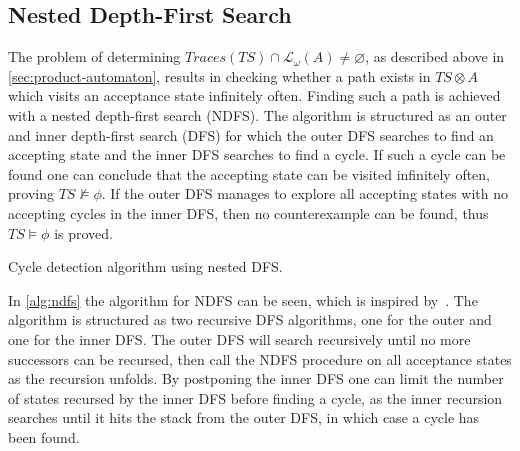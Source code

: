 \subsection{Nested Depth-First Search}\label{sec:methods-ndfs}
The problem of determining $Traces(TS) \cap \mathcal{L_\omega}(A) \neq \varnothing$, as described above in \autoref{sec:product-automaton}, results in checking whether a path exists in $TS \otimes A$ which visits an acceptance state infinitely often. Finding such a path is achieved with a nested depth-first search (NDFS). The algorithm is structured as an outer and inner depth-first search (DFS) for which the outer DFS searches to find an accepting state and the inner DFS searches to find a cycle. If such a cycle can be found one can conclude that the accepting state can be visited infinitely often, proving $TS \not\models \phi$. If the outer DFS manages to explore all accepting states with no accepting cycles in the inner DFS, then no counterexample can be found, thus $TS \models \phi$ is proved.
\begin{algorithm}[H]
\SetAlgoLined
\DontPrintSemicolon
{}
\;

\caption{Cycle detection algorithm using nested DFS.}
\label{alg:ndfs}
\end{algorithm}
In \autoref{alg:ndfs} the algorithm for NDFS can be seen, which is inspired by~\cite[Fig.~4]{holzmann1996nested}. The algorithm is structured as two recursive DFS algorithms, one for the outer and one for the inner DFS. The outer DFS will search recursively until no more successors can be recursed, then call the NDFS procedure on all acceptance states as the recursion unfolds. By postponing the inner DFS one can limit the number of states recursed by the inner DFS before finding a cycle, as the inner recursion searches until it hits the stack from the outer DFS, in which case a cycle has been found.